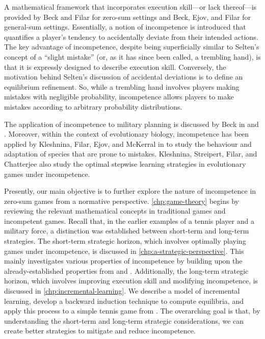     A mathematical framework that incorporates execution skill---or lack thereof---is provided by Beck and Filar \parencite{Beck2007} for zero-sum settings and Beck, Ejov, and Filar \parencite{Beck2012} for general-sum settings.
    Essentially, a notion of incompetence is introduced that quantifies a player's tendency to accidentally deviate from their intended actions.
    The key advantage of incompetence, despite being superficially similar to Selten's \parencite{Selten1975} concept of a ``slight mistake'' (or, as it has since been called, a trembling hand), is that it is expressly designed to describe execution skill.
    Conversely, the motivation behind Selten's \parencite{Selten1975} discussion of accidental deviations is to define an equilibrium refinement.
    So, while a trembling hand involves players making mistakes with negligible probability, incompetence allows players to make mistakes according to arbitrary probability distributions.

    The application of incompetence to military planning is discussed by Beck in \parencite{Beck2013} and \parencite{Beck2011}.
    Moreover, within the context of evolutionary biology, incompetence has been applied by Kleshnina, Filar, Ejov, and McKerral in \parencite{Kleshnina2018} to study the behaviour and adaptation of species that are prone to mistakes.
    Kleshnina, Streipert, Filar, and Chatterjee \parencite{Kleshnina2020} also study the optimal stepwise learning strategies in evolutionary games under incompetence.

    Presently, our main objective is to further explore the nature of incompetence in zero-sum games from a normative perspective.
    \autoref{chp:game-theory} begins by reviewing the relevant mathematical concepts in traditional games and incompetent games.
    Recall that, in the earlier examples of a tennis player and a military force, a distinction was established between short-term and long-term strategies.
    The short-term strategic horizon, which involves optimally playing games under incompetence, is discussed in \autoref{chp:a-strategic-perspective}.
    This mainly investigates various properties of incompetence by building upon the already-established properties from \parencite{Beck2013} and \parencite{Beck2007}.
    Additionally, the long-term strategic horizon, which involves improving execution skill and modifying incompetence, is discussed in \autoref{chp:incremental-learning}.
    We describe a model of incremental learning, develop a backward induction technique to compute equilibria, and apply this process to a simple tennis game from \parencite{Beck2013}.
    The overarching goal is that, by understanding the short-term and long-term strategic considerations, we can create better strategies to mitigate and reduce incompetence.